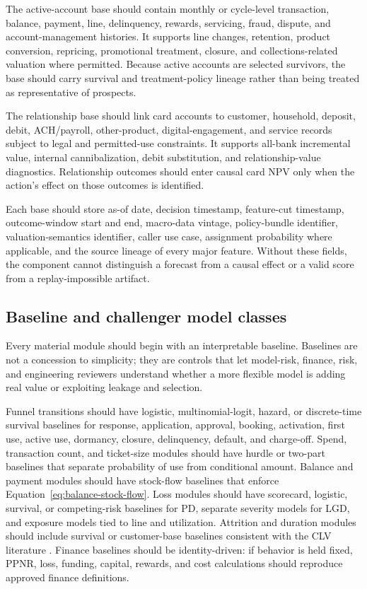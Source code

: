 \documentclass[11pt]{article}
\newcommand{\1}{\mathbf{1}}
\begin{document}
The active-account base should contain monthly or cycle-level transaction,
balance, payment, line, delinquency, rewards, servicing, fraud, dispute, and
account-management histories. It supports line changes, retention, product
conversion, repricing, promotional treatment, closure, and collections-related
valuation where permitted. Because active accounts are selected survivors, the
base should carry survival and treatment-policy lineage rather than being
treated as representative of prospects.

The relationship base should link card accounts to customer, household,
deposit, debit, ACH/payroll, other-product, digital-engagement, and service
records subject to legal and permitted-use constraints. It supports all-bank
incremental value, internal cannibalization, debit substitution, and
relationship-value diagnostics. Relationship outcomes should enter causal card
NPV only when the action's effect on those outcomes is identified.

Each base should store as-of date, decision timestamp, feature-cut timestamp,
outcome-window start and end, macro-data vintage, policy-bundle identifier,
valuation-semantics identifier, caller use case, assignment probability where
applicable, and the source lineage of every major feature. Without these
fields, the component cannot distinguish a forecast from a causal effect or a
valid score from a replay-impossible artifact.

\subsection{Baseline and challenger model classes}
\label{subsec:model-classes}

Every material module should begin with an interpretable baseline. Baselines
are not a concession to simplicity; they are controls that let model-risk,
finance, risk, and engineering reviewers understand whether a more flexible
model is adding real value or exploiting leakage and selection.

Funnel transitions should have logistic, multinomial-logit, hazard, or
discrete-time survival baselines for response, application, approval, booking,
activation, first use, active use, dormancy, closure, delinquency, default,
and charge-off. Spend, transaction count, and ticket-size modules should have
hurdle or two-part baselines that separate probability of use from conditional
amount. Balance and payment modules should have stock-flow baselines that
enforce Equation~\eqref{eq:balance-stock-flow}. Loss modules should have
scorecard, logistic, survival, or competing-risk baselines for PD, separate
severity models for LGD, and exposure models tied to line and utilization.
Attrition and duration modules should include survival or customer-base
baselines consistent with the CLV literature
\citep{schmittlein1987counting,fader2005bgnbd,bolton1998duration}. Finance
baselines should be identity-driven: if behavior is held fixed, PPNR, loss,
funding, capital, rewards, and cost calculations should reproduce approved
finance definitions.
\end{document}
